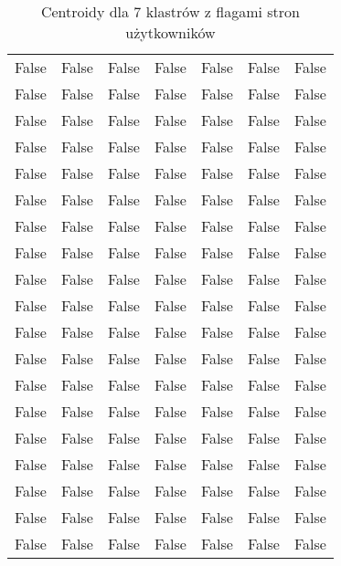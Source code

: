 \documentclass[../EDI_Task3_Karwowski_Kowalewski.tex]{subfiles}
\begin{document}
{{\begin{table}[!htbp]
\begin{tabular}{|c|c|c|c|c|c|c|}
                False   &   False   &   False   &   False   &   False   &   False   &   False \\
                False   &   False   &   False   &   False   &   False   &   False   &   False \\
                False   &   False   &   False   &   False   &   False   &   False   &   False \\
                False   &   False   &   False   &   False   &   False   &   False   &   False \\
                False   &   False   &   False   &   False   &   False   &   False   &   False \\
                False   &   False   &   False   &   False   &   False   &   False   &   False \\
                False   &   False   &   False   &   False   &   False   &   False   &   False \\
                False   &   False   &   False   &   False   &   False   &   False   &   False \\
                False   &   False   &   False   &   False   &   False   &   False   &   False \\
                False   &   False   &   False   &   False   &   False   &   False   &   False \\
                False   &   False   &   False   &   False   &   False   &   False   &   False \\
                False   &   False   &   False   &   False   &   False   &   False   &   False \\
                False   &   False   &   False   &   False   &   False   &   False   &   False \\
                False   &   False   &   False   &   False   &   False   &   False   &   False \\
                False   &   False   &   False   &   False   &   False   &   False   &   False \\
                False   &   False   &   False   &   False   &   False   &   False   &   False \\
                False   &   False   &   False   &   False   &   False   &   False   &   False \\
                False   &   False   &   False   &   False   &   False   &   False   &   False \\
                False   &   False   &   False   &   False   &   False   &   False   &   False \\ \hline
            \end{tabular}
            \caption{Centroidy dla 7 klastrów z flagami stron użytkowników}
        \end{table}

}}
\end{document}
